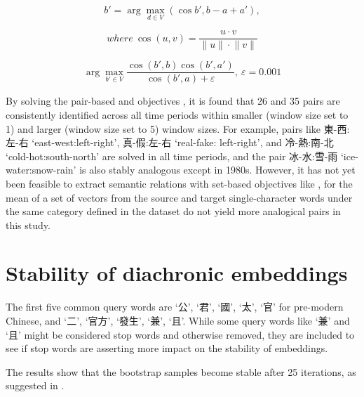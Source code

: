 \begin{equation}
  b' = \arg\max_{d \in V}(\cos b', b - a + a'){,}
\end{equation}

\begin{equation*}
  where\: \cos(u,v) = \frac{u \cdot v}{\lVert{u}\rVert \cdot \lVert{v}\rVert}
\end{equation*}

\begin{equation}
  \arg\max_{b' \in V}\frac{\cos(b',b) \cos(b',a')}{\cos(b',a) + \varepsilon}{,}\: \varepsilon = 0.001
\end{equation}

By solving the pair-based  and  objectives \parencite{levy2014linguistic}, it is found that 26 and 35 pairs are consistently identified across all time periods within smaller (window size set to 1) and larger (window size set to 5) window sizes. For example, pairs like 東-西:左-右 `east-west:left-right', 真-假:左-右 `real-fake: left-right', and 冷-熱:南-北 `cold-hot:south-north' are solved in all time periods, and the pair 冰-水:雪-雨 `ice-water:snow-rain' is also stably analogous except in 1980s. However, it has not yet been feasible to extract semantic relations with set-based objectives like , for the mean of a set of vectors from the source and target single-character words under the same category defined in the dataset do not yield more analogical pairs in this study. %

\section{Stability of  diachronic embeddings}

The first five common query words are `公', `君', `國', `太', `官' for pre-modern Chinese, and `二', `官方', `發生', `兼', `且'. While some query words like `兼' and `且' might be considered stop words and otherwise removed, they are included to see if stop words are asserting more impact on the stability of  embeddings.

The results show that the bootstrap samples become stable after 25 iterations, as suggested in \textcite{antoniak2018evaluating}. 

